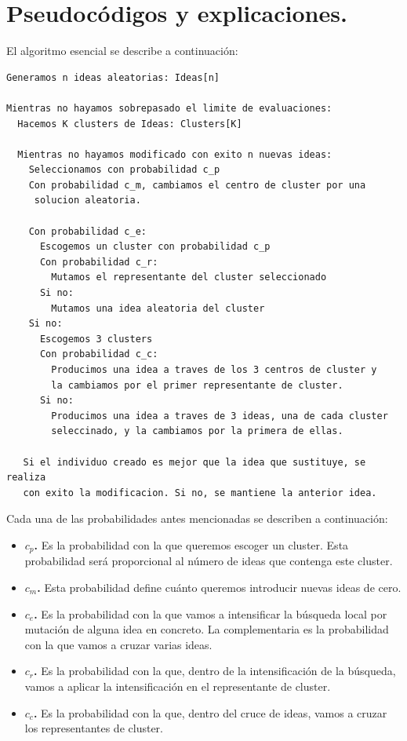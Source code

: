 \newpage

\section{Pseudocódigos y explicaciones.}
El algoritmo esencial se describe a continuación:\\

\noindent\hrulefill

\begin{lstlisting}
Generamos n ideas aleatorias: Ideas[n]

Mientras no hayamos sobrepasado el limite de evaluaciones:
  Hacemos K clusters de Ideas: Clusters[K]

  Mientras no hayamos modificado con exito n nuevas ideas:
    Seleccionamos con probabilidad c_p
    Con probabilidad c_m, cambiamos el centro de cluster por una
     solucion aleatoria.

    Con probabilidad c_e:
      Escogemos un cluster con probabilidad c_p
      Con probabilidad c_r:
        Mutamos el representante del cluster seleccionado
      Si no:
        Mutamos una idea aleatoria del cluster
    Si no:
      Escogemos 3 clusters
      Con probabilidad c_c:
        Producimos una idea a traves de los 3 centros de cluster y
        la cambiamos por el primer representante de cluster.
      Si no:
        Producimos una idea a traves de 3 ideas, una de cada cluster
        seleccinado, y la cambiamos por la primera de ellas.

   Si el individuo creado es mejor que la idea que sustituye, se realiza
   con exito la modificacion. Si no, se mantiene la anterior idea.

\end{lstlisting}

\noindent\hrulefill

Cada una de las probabilidades antes mencionadas se describen a continuación:\\

\begin{itemize}
	\item \textbf{$c_p$.} Es la probabilidad con la que queremos escoger un cluster. Esta probabilidad será proporcional al número de ideas que contenga este cluster.
	\item \textbf{$c_m$.} Esta probabilidad define cuánto queremos introducir nuevas ideas de cero.
	\item \textbf{$c_e$.} Es la probabilidad con la que vamos a intensificar la búsqueda local por mutación de alguna idea en concreto. La complementaria es la probabilidad con la que vamos a cruzar varias ideas.
	\item \textbf{$c_r$.} Es la probabilidad con la que, dentro de la intensificación de la búsqueda, vamos a aplicar la intensificación en el representante de cluster.
	\item \textbf{$c_c$.} Es la probabilidad con la que, dentro del cruce de ideas, vamos a cruzar los representantes de cluster.
\end{itemize}

